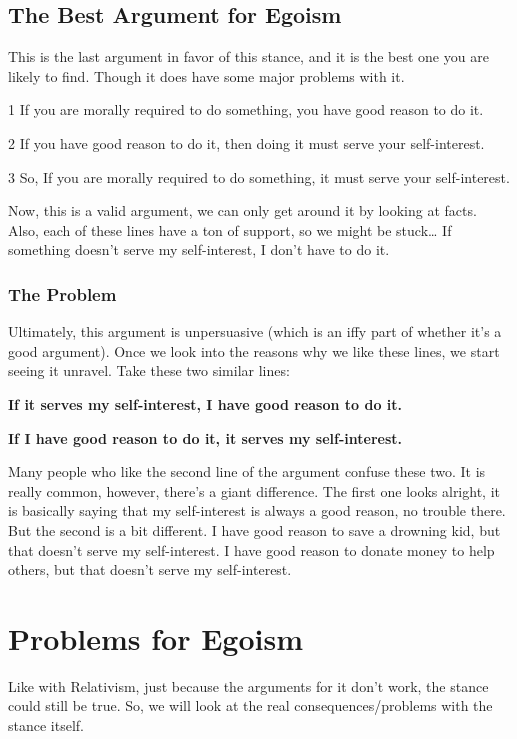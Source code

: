 \subsection{The Best Argument for Egoism}

This is the last argument in favor of this stance, and it is the best one you are likely to find. Though it does have some major problems with it.
\begin{earg}
\item[1] If you are morally required to do something, you have good reason to do it.
\item[2] If you have good reason to do it, then doing it must serve your self-interest.
\item[3] So, If you are morally required to do something, it must serve your self-interest.
\end{earg}
Now, this is a valid argument, we can only get around it by looking at facts. Also, each of these lines have a ton of support, so we might be stuck… If something doesn’t serve my self-interest, I don’t have to do it.

\subsubsection{The Problem}

Ultimately, this argument is unpersuasive (which is an iffy part of whether it’s a good argument). Once we look into the reasons why we like these lines, we start seeing it unravel. Take these two similar lines:
\begin{center}
\textbf{If it serves my self-interest, I have good reason to do it.}

\textbf{If I have good reason to do it, it serves my self-interest.}
\end{center}
Many people who like the second line of the argument confuse these two. It is really common, however, there’s a giant difference. The first one looks alright, it is basically saying that my self-interest is always a good reason, no trouble there. But the second is a bit different. I have good reason to save a drowning kid, but that doesn’t serve my self-interest. I have good reason to donate money to help others, but that doesn’t serve my self-interest.

\section{Problems for Egoism}

Like with Relativism, just because the arguments for it don't work, the stance could still be true. So, we will look at the real consequences/problems with the stance itself.
